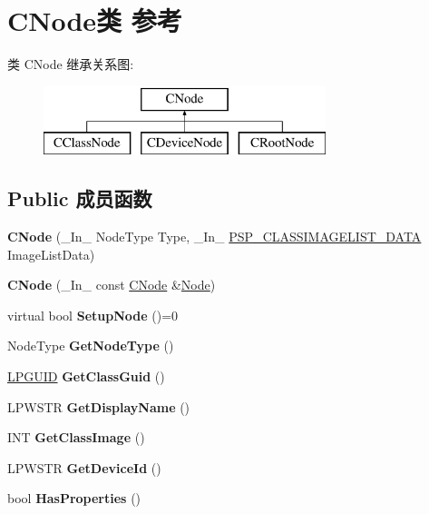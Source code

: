 \hypertarget{class_c_node}{}\section{C\+Node类 参考}
\label{class_c_node}
类 C\+Node 继承关系图\+:\begin{figure}[H]
\begin{center}
\leavevmode
\includegraphics[height=2.000000cm]{class_c_node}
\end{center}
\end{figure}
\subsection*{Public 成员函数}
\begin{DoxyCompactItemize}
\item 
\mbox{\label{class_c_node_af17ba68470fe18a796f0abce9e519e0d}} 
{\bfseries C\+Node} (\+\_\+\+In\+\_\+ Node\+Type Type, \+\_\+\+In\+\_\+ \hyperlink{struct___s_p___c_l_a_s_s_i_m_a_g_e_l_i_s_t___d_a_t_a}{P\+S\+P\+\_\+\+C\+L\+A\+S\+S\+I\+M\+A\+G\+E\+L\+I\+S\+T\+\_\+\+D\+A\+TA} Image\+List\+Data)
\item 
\mbox{\label{class_c_node_a584e80d64c5f05b5858c248e6ff5071d}} 
{\bfseries C\+Node} (\+\_\+\+In\+\_\+ const \hyperlink{class_c_node}{C\+Node} \&\hyperlink{uniongl__dlist__node}{Node})
\item 
\mbox{\label{class_c_node_a1d99273b597c2dab5b312aaed958070b}} 
virtual bool {\bfseries Setup\+Node} ()=0
\item 
\mbox{\label{class_c_node_ab5f2f1a99a33b0df716fe604f96f0742}} 
Node\+Type {\bfseries Get\+Node\+Type} ()
\item 
\mbox{\label{class_c_node_a1a0eb570053511d007384571b285c135}} 
\hyperlink{interface_g_u_i_d}{L\+P\+G\+U\+ID} {\bfseries Get\+Class\+Guid} ()
\item 
\mbox{\label{class_c_node_a9345e9be8fecf8e037ff8c9e647d9f3a}} 
L\+P\+W\+S\+TR {\bfseries Get\+Display\+Name} ()
\item 
\mbox{\label{class_c_node_a262486ab774f4fb73772ce79f5d93be2}} 
I\+NT {\bfseries Get\+Class\+Image} ()
\item 
\mbox{\label{class_c_node_a84c61e77ea0e9f6d71bd2d5d9387951f}} 
L\+P\+W\+S\+TR {\bfseries Get\+Device\+Id} ()
\item 
\mbox{\label{class_c_node_a564ef7b6455bc76cc771e84c713f4e14}} 
bool {\bfseries Has\+Properties} ()
\end{DoxyCompactItemize}
